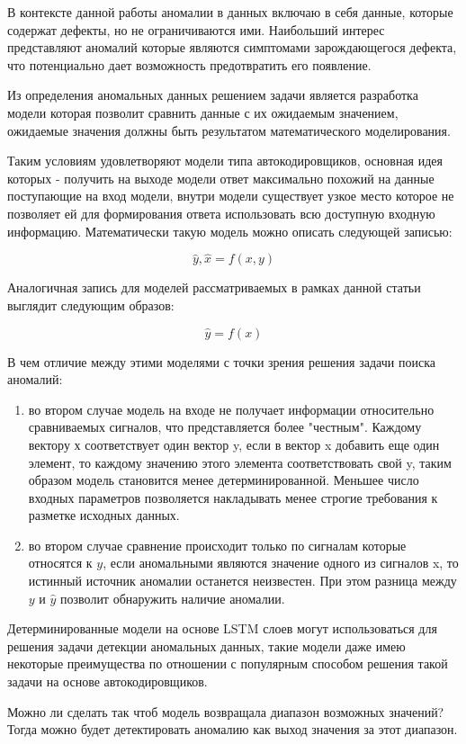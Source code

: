 \documentclass[12pt,a4paper]{article}
\begin{document}
В контексте данной работы аномалии в данных включаю в себя данные, которые содержат дефекты, но не ограничиваются ими. Наибольший интерес представляют аномалий которые  являются симптомами зарождающегося дефекта, что потенциально дает возможность предотвратить его появление.

Из определения аномальных данных решением задачи является разработка модели которая позволит сравнить данные с их ожидаемым значением, ожидаемые значения должны быть результатом математического моделирования.

Таким условиям удовлетворяют модели типа автокодировщиков, основная идея которых - получить на выходе модели ответ максимально похожий на данные поступающие на вход модели, внутри модели существует узкое место которое не позволяет ей для формирования ответа использовать всю доступную входную информацию. Математически такую модель можно описать следующей записью:

$$\hat{y},\hat{x} = f(x,y)$$

Аналогичная запись для моделей рассматриваемых в рамках данной статьи выглядит следующим образов:

$$\hat{y} = f(x)$$

В чем отличие между этими моделями с точки зрения решения задачи поиска аномалий:
\begin{enumerate}
	\item во втором случае модель на входе не получает информации относительно сравниваемых сигналов, что представляется более "честным". Каждому вектору х соответствует один вектор y, если в вектор x добавить еще один элемент, то каждому значению этого элемента соответствовать свой y, таким образом модель становится менее детерминированной. Меньшее число входных параметров позволяется накладывать менее строгие требования к разметке исходных данных.
	\item во втором случае сравнение происходит только по сигналам которые относятся к $y$, если аномальными являются значение одного из сигналов x, то истинный источник аномалии останется неизвестен. При этом разница между $y$ и $\hat{y}$ позволит обнаружить наличие аномалии.
\end{enumerate}

Детерминированные модели на основе LSTM слоев могут использоваться для решения задачи детекции аномальных данных, такие модели даже имею некоторые преимущества по отношении с популярным способом решения такой задачи на основе автокодировщиков.

 Можно ли сделать так чтоб модель возвращала диапазон возможных значений? Тогда можно будет детектировать аномалию как выход значения за этот диапазон.
 
\end{document}
